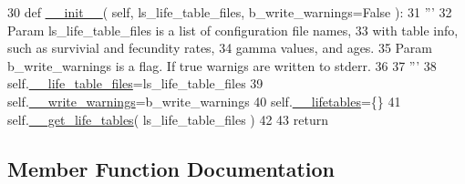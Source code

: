 \begin{DoxyCode}
30     \textcolor{keyword}{def }\hyperlink{classnegui_1_1pgsimupopresources_1_1PGSimuPopResources_a8e79c3f4c6c291a606c9f0c2f259a293}{\_\_init\_\_}( self, ls\_life\_table\_files, b\_write\_warnings=False ):
31         \textcolor{stringliteral}{'''}
32 \textcolor{stringliteral}{        Param ls\_life\_table\_files is a list of configuration file names,}
33 \textcolor{stringliteral}{            with table info, such as survivial and fecundity rates,}
34 \textcolor{stringliteral}{            gamma values, and ages.}
35 \textcolor{stringliteral}{        Param b\_write\_warnings is a flag. If true warnigs are written to stderr.}
36 \textcolor{stringliteral}{        }
37 \textcolor{stringliteral}{        '''}
38         self.\hyperlink{classnegui_1_1pgsimupopresources_1_1PGSimuPopResources_a70ffb8eb62a843aec8f42e337c81fc3b}{\_\_life\_table\_files}=ls\_life\_table\_files
39         self.\hyperlink{classnegui_1_1pgsimupopresources_1_1PGSimuPopResources_ae4805ab6ba55817bc2e40fd622d76483}{\_\_write\_warnings}=b\_write\_warnings
40         self.\hyperlink{classnegui_1_1pgsimupopresources_1_1PGSimuPopResources_ae32ca7cc4b6a1563734a82da0a0c6608}{\_\_lifetables}=\{\}
41         self.\hyperlink{classnegui_1_1pgsimupopresources_1_1PGSimuPopResources_aed06da70af5eea2be1c6caabf35032af}{\_\_get\_life\_tables}( ls\_life\_table\_files )
42 
43         \textcolor{keywordflow}{return}
\end{DoxyCode}


\subsection{Member Function Documentation}
